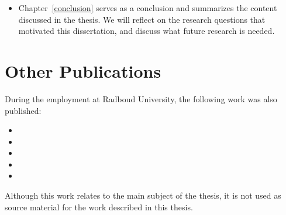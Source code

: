 \begin{itemize}
	{
		\scriptsize
		\begin{itemize}
			\item {}
		\end{itemize}
	}
	
	\item Chapter~\ref{conclusion} serves as a conclusion and summarizes the content discussed in the thesis. We will reflect on the research questions that motivated this dissertation, and discuss what future research is needed.
\end{itemize}

\section{Other Publications}
During the employment at Radboud University, the following work was also published: 

{\scriptsize
	\begin{itemize}	
		\item {}
		\item {}	
		\item {}
		\item {}
		\item {}
	\end{itemize}
}

Although this work relates to the main subject of the thesis, it is not used as source material for the work described in this thesis. 
